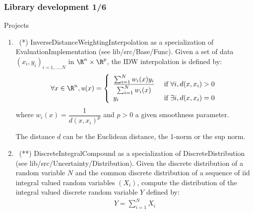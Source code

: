 \documentclass[8pt]{beamer}
\begin{document}
\begin{frame}
  \frametitle{Library development 1/6}
  \begin{block}{Projects}
    \begin{enumerate}
    \item~(*) \alert{\ttfamily InverseDistanceWeightingInterpolation} as a specialization of \alert{\ttfamily EvaluationImplementation} (see {\ttfamily lib/src/Base/Func}). Given a set of data $(x_i, y_i)_{i=1,\dots,N}$ in $\R^n\times\R^p$, the IDW interpolation is defined by:
      \begin{align}
        \forall x\in\R^n, u(x)=\left\{\begin{array}{ll}
                                        \dfrac{\sum_{i=1}^Nw_i(x)y_i}{\sum_{i=1}^Nw_i(x)} & \mbox{ if } \forall i, d(x, x_i) > 0\\
                                        y_i & \mbox{ if } \exists i, d(x, x_i)=0
                                      \end{array}
                                              \right.
      \end{align}
      where $w_i(x)=\dfrac{1}{d(x, x_i)^p}$ and $p>0$ a given smoothness parameter.

      The distance $d$ can be the Euclidean distance, the 1-norm or the sup norm.
    \item~(**) \alert{\ttfamily DiscreteIntegralCompound} as a specialization of \alert{\ttfamily DiscreteDistribution} (see {\ttfamily lib/src/Uncertainty/Distribution}). Given the discrete distribution of a random variable $N$ and the common discrete distribution of a sequence of iid integral valued random variables $(X_i)$, compute the distribution of the integral valued discrete random variable $Y$ defined by:
      \begin{align}
        Y = \sum_{i=1}^N X_i
      \end{align}
    \end{enumerate}
  \end{block}
\end{frame}
\end{document}
